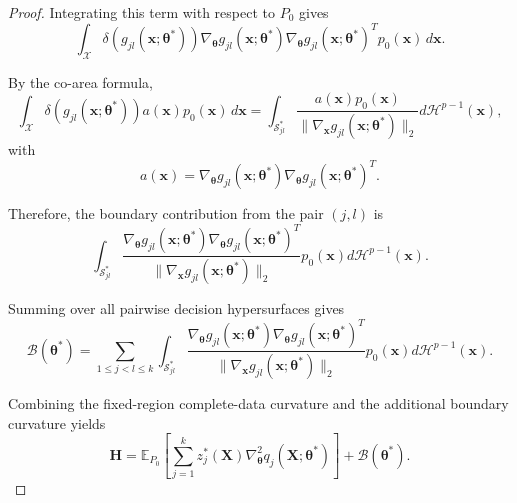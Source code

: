 \documentclass[pdflatex,sn-mathphys-ay]{sn-jnl}%
\let\oldtheta\theta
\renewcommand{\theta}{\boldsymbol{\oldtheta}}
\theoremstyle{thmstyleone}%
\theoremstyle{thmstyletwo}%
\theoremstyle{thmstylethree}%
\begin{document}
\begin{proof}
Integrating this term with respect to $P_0$ gives
\[
    \int_{\mathcal{X}}
    \delta
    \left(
        g_{jl}
        (\mathbf{x};\boldsymbol{\theta}^*)
    \right)
    \nabla_{\boldsymbol{\theta}}
    g_{jl}
    (\mathbf{x};\boldsymbol{\theta}^*)
    \nabla_{\boldsymbol{\theta}}
    g_{jl}
    (\mathbf{x};\boldsymbol{\theta}^*)^T
    p_0(\mathbf{x})
    \,
    d\mathbf{x}.
\]

By the co-area formula,
\[
    \int_{\mathcal{X}}
    \delta
    \left(
        g_{jl}
        (\mathbf{x};\boldsymbol{\theta}^*)
    \right)
    a(\mathbf{x})
    p_0(\mathbf{x})
    \,
    d\mathbf{x}
    =
    \int_{\mathcal{S}_{jl}^*}
    \frac{
        a(\mathbf{x})
        p_0(\mathbf{x})
    }{
        \|
            \nabla_{\mathbf{x}}
            g_{jl}
            (\mathbf{x};\boldsymbol{\theta}^*)
        \|_2
    }
    d\mathcal{H}^{p-1}(\mathbf{x}),
\]
with
\[
    a(\mathbf{x})
    =
    \nabla_{\boldsymbol{\theta}}
    g_{jl}
    (\mathbf{x};\boldsymbol{\theta}^*)
    \nabla_{\boldsymbol{\theta}}
    g_{jl}
    (\mathbf{x};\boldsymbol{\theta}^*)^T.
\]

Therefore, the boundary contribution from the pair $(j,l)$ is
\[
    \int_{\mathcal{S}_{jl}^*}
    \frac{
        \nabla_{\boldsymbol{\theta}}
        g_{jl}
        (\mathbf{x};\boldsymbol{\theta}^*)
        \nabla_{\boldsymbol{\theta}}
        g_{jl}
        (\mathbf{x};\boldsymbol{\theta}^*)^T
    }{
        \|
            \nabla_{\mathbf{x}}
            g_{jl}
            (\mathbf{x};\boldsymbol{\theta}^*)
        \|_2
    }
    p_0(\mathbf{x})
    d\mathcal{H}^{p-1}(\mathbf{x}).
\]

Summing over all pairwise decision hypersurfaces gives
\[
    \mathcal{B}
    (\boldsymbol{\theta}^*)
    =
    \sum_{1\leq j<l\leq k}
    \int_{\mathcal{S}_{jl}^*}
    \frac{
        \nabla_{\boldsymbol{\theta}}
        g_{jl}
        (\mathbf{x};\boldsymbol{\theta}^*)
        \nabla_{\boldsymbol{\theta}}
        g_{jl}
        (\mathbf{x};\boldsymbol{\theta}^*)^T
    }{
        \|
            \nabla_{\mathbf{x}}
            g_{jl}
            (\mathbf{x};\boldsymbol{\theta}^*)
        \|_2
    }
    p_0(\mathbf{x})
    d\mathcal{H}^{p-1}(\mathbf{x}).
\]

Combining the fixed-region complete-data curvature and the additional boundary curvature yields
\[
    \mathbf{H}
    =
    \mathbb{E}_{P_0}
    \left[
        \sum_{j=1}^k
        z_j^*(\mathbf{X})
        \nabla_{\boldsymbol{\theta}}^2
        q_j(\mathbf{X};\boldsymbol{\theta}^*)
    \right]
    +
    \mathcal{B}
    (\boldsymbol{\theta}^*).
\]


\end{proof}
\end{document}
